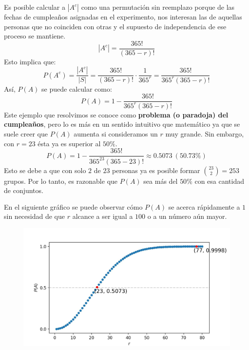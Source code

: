 \documentclass[12pt]{article}
\begin{document}
Es posible calcular a $|A^{c}|$ como una permutación sin reemplazo porque de las fechas de cumpleaños asignadas en el experimento, nos interesan las de aquellas personas que no coinciden con otras y el supuesto de independencia de ese proceso se mantiene.
\[
  |A^{c}| = \frac{365!}{(365 - r)!}
\]
Esto implica que:
\[
  P(A^{c}) = \frac{|A^{c}|}{|S|}
           = \frac{365!}{(365 - r)!} \cdot \frac{1}{365^{r}}
           = \frac{365!}{365^{r} (365 - r)!}
\]
Así, $P(A)$ se puede calcular como:
\[
  P(A) = 1 - \frac{365!}{365^{r} (365 - r)!}
\]
Este ejemplo que resolvimos se conoce como \textbf{problema (o paradoja) del cumpleaños}, pero lo es más en un sentido intuitivo que matemático ya que se suele creer que $P(A)$ aumenta si consideramos un $r$ muy grande. Sin embargo, con $r = 23$ ésta ya es superior al $50\%$.
\[
  P(A) = 1 - \frac{365!}{365^{23} (365 - 23)!}
       \approx 0.5073 \ (50.73\%)
\]
Esto se debe a que con solo $2$ de $23$ personas ya es posible formar $\binom{23}{2} = 253$ grupos. Por lo tanto, es razonable que $P(A)$ sea más del $50\%$ con esa cantidad de conjuntos.

En el siguiente gráfico se puede observar cómo $P(A)$ se acerca rápidamente a $1$ sin necesidad de que $r$ alcance a ser igual a $100$ o a un número aún mayor.

\begin{figure}[hbt!]
\centering
\includegraphics[scale = 0.7]{problema-cumple.jpg}
\end{figure}
\end{document}
